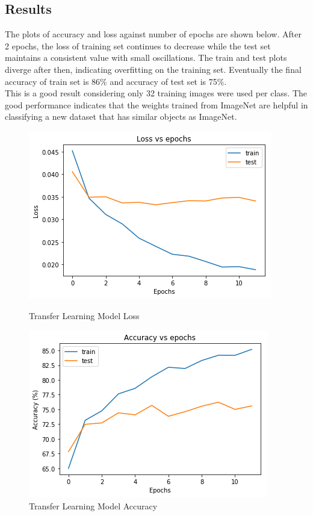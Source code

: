 \documentclass{article}
\begin{document}
\subsection{Results}
The plots of accuracy and loss against number of epochs are shown below. After 2 epochs, the loss of training set continues to decrease while the test set maintains a consistent value with small oscillations. The train and test plots diverge after then, indicating overfitting on the training set. Eventually the final accuracy of train set is 86\% and accuracy of test set is 75\%.\\
This is a good result considering only 32 training images were used per class. The good performance indicates that the weights trained from ImageNet are helpful in classifying a new dataset that has similar objects as ImageNet.\\
\begin{figure}[h!]
	\begin{minipage}{0.48\textwidth}
		\centering
		\includegraphics[width=\textwidth]{part2_pics/loss_epochs.png}
		\caption{Transfer Learning Model Loss}
	\end{minipage}
	\hfill
	\begin{minipage}{0.48\textwidth}
		\centering
		\includegraphics[width=\textwidth]{part2_pics/acc_epochs.png}
		\caption{Transfer Learning Model Accuracy}
	\end{minipage}
\end{figure}
\end{document}
